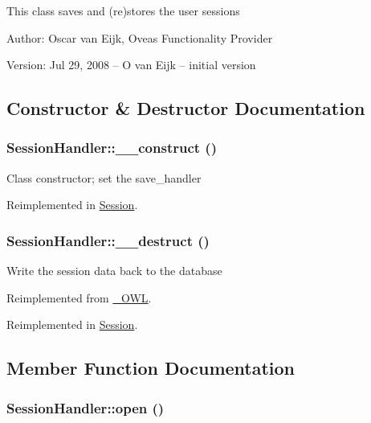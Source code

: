This class saves and (re)stores the user sessions \begin{Desc}
\item[Author:]Oscar van Eijk, Oveas Functionality Provider \end{Desc}
\begin{Desc}
\item[Version:]Jul 29, 2008 -- O van Eijk -- initial version \end{Desc}


\subsection{Constructor \& Destructor Documentation}
\hypertarget{classSessionHandler_546ba6d31a1ce532de13f65aadc3be0e}{
\subsubsection{\setlength{\rightskip}{0pt plus 5cm}SessionHandler::\_\-\_\-construct ()}}
\label{classSessionHandler_546ba6d31a1ce532de13f65aadc3be0e}


Class constructor; set the save\_\-handler 

Reimplemented in \hyperlink{classSession_36373ba15d6c8f932aeea02d7320d7c8}{Session}.\hypertarget{classSessionHandler_461097c3ee6b1aecf833ce1225d02329}{
\subsubsection{\setlength{\rightskip}{0pt plus 5cm}SessionHandler::\_\-\_\-destruct ()}}
\label{classSessionHandler_461097c3ee6b1aecf833ce1225d02329}


Write the session data back to the database 

Reimplemented from \hyperlink{class__OWL_44fd2222476a3109286cc82d92b6bbcc}{\_\-OWL}.

Reimplemented in \hyperlink{classSession_a498272c85524e4700abc3363883165b}{Session}.

\subsection{Member Function Documentation}
\hypertarget{classSessionHandler_50aa0b123f53d99de350a0eb02b4bfa5}{
\subsubsection{\setlength{\rightskip}{0pt plus 5cm}SessionHandler::open ()}}
\label{classSessionHandler_50aa0b123f53d99de350a0eb02b4bfa5}


